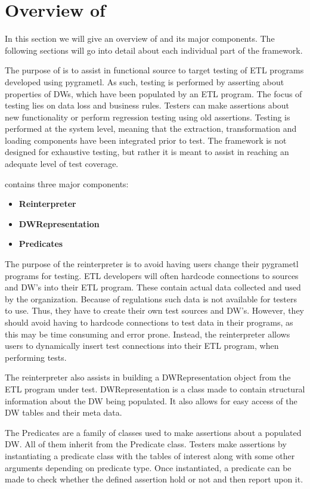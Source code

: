 \section{Overview of \FW{}}\label{sect:Overview}
In this section we will give an overview of \FW{} and its major components. The following sections will go into detail about each individual part of the framework.

The purpose of \FW{} is to assist in functional source to target testing of ETL programs developed using pygrametl. As such, testing is performed by asserting about properties of DWs, which have been populated by an ETL program. The focus of testing lies on data loss and business rules. Testers can make assertions about new functionality or perform regression testing using old assertions. Testing is performed at the system level, meaning that the extraction, transformation and loading components have been integrated prior to test. The framework is not designed for exhaustive testing, but rather it is meant to assist in reaching an adequate level of test coverage.

\FW{} contains three major components:
\begin{itemize}
\item\textbf{Reinterpreter}
\item\textbf{DWRepresentation}
\item\textbf{Predicates}
\end{itemize}

The purpose of the reinterpreter is to avoid having users change their pygrametl programs for testing. ETL developers will often hardcode connections to sources and DW's into their ETL program. These contain actual data collected and used by the organization. Because of regulations such data is not available for testers to use. Thus, they have to create their own test sources and DW's. However, they should avoid having to hardcode connections to test data in their programs, as this may be time consuming and error prone. Instead, the reinterpreter allows users to dynamically insert test connections into their ETL program, when performing tests.

The reinterpreter also assists in building a DWRepresentation object from the ETL program under test. DWRepresentation is a class made to contain structural information about the DW being populated. It also allows for easy access of the DW tables and their meta data.

The Predicates are a family of classes used to make assertions about a populated DW. All of them inherit from the Predicate class. Testers make assertions by instantiating a predicate class with the tables of interest along with some other arguments depending on predicate type. Once instantiated, a predicate can be made to check whether the defined assertion hold or not and then report upon it.

